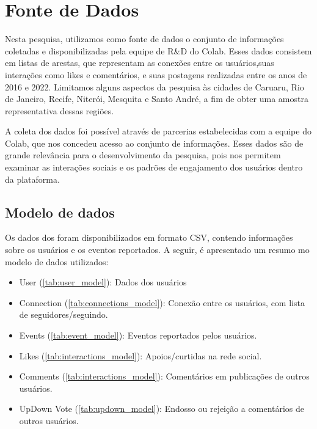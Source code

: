 \section{Fonte de Dados}
Nesta pesquisa, utilizamos como fonte de dados o conjunto de informações coletadas e disponibilizadas pela equipe de R\&D do Colab. Esses dados consistem em listas de arestas, que representam as conexões entre os usuários,suas interações como likes e comentários, e suas postagens realizadas entre os anos de 2016 e 2022. Limitamos alguns aspectos da pesquisa às cidades de Caruaru, Rio de Janeiro, Recife, Niterói, Mesquita e Santo André, a fim de obter uma amostra representativa dessas regiões.

A coleta dos dados foi possível através de parcerias estabelecidas com a equipe do Colab, que nos concedeu acesso ao conjunto de informações. Esses dados são de grande relevância para o desenvolvimento da pesquisa, pois nos permitem examinar as interações sociais e os padrões de engajamento dos usuários dentro da plataforma.

\subsection*{Modelo de dados}
\label{sec:modelo_de_dados}

Os dados dos foram disponibilizados em formato CSV, contendo informações sobre os usuários e os eventos reportados. A seguir, é apresentado um resumo mo modelo de dados utilizados:

\begin{itemize}
	\item User (\autoref{tab:user_model}): Dados dos usuários
	\item Connection (\autoref{tab:connections_model}): Conexão entre os usuários, com lista de seguidores/seguindo.
	\item Events (\autoref{tab:event_model}): Eventos reportados pelos usuários.
	\item Likes (\autoref{tab:interactions_model}): Apoios/curtidas na rede social.
	\item Comments (\autoref{tab:interactions_model}): Comentários em publicações de outros usuários.
	\item UpDown Vote (\autoref{tab:updown_model}): Endosso ou rejeição a comentários de outros usuários.
\end{itemize}

